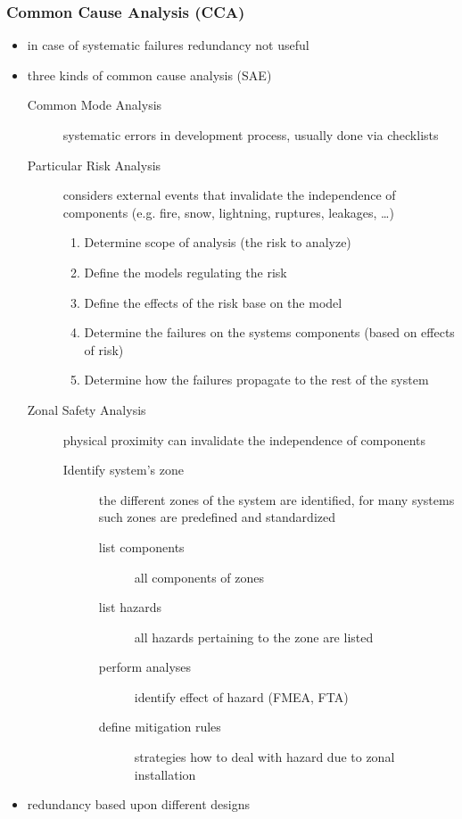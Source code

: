 \documentclass[a4paper, 10pt]{article}
\begin{document}
\subsubsection*{Common Cause Analysis (CCA)}
\begin{itemize}
    \item in case of systematic failures \follows redundancy not useful
    \item three kinds of common cause analysis (SAE)
    \begin{description}
        \item[Common Mode Analysis] systematic errors in development process, usually done via checklists
        \item[Particular Risk Analysis] considers external events that invalidate the independence of components (e.g. fire, snow, lightning, ruptures, leakages, \dots)
        \begin{enumerate}
            \item Determine scope of analysis (the risk to analyze)
            \item Define the models regulating the risk
            \item Define the effects of the risk base on the model
            \item Determine the failures on the systems components (based on effects of risk)
            \item Determine how the failures propagate to the rest of the system
        \end{enumerate}
        \item[Zonal Safety Analysis] physical proximity can invalidate the independence of components
        \begin{description}
            \item[Identify system's zone] the different zones of the system are identified, for many systems such zones are predefined and standardized
            \begin{description}
                \item[list components] all components of zones
                \item[list hazards] all hazards pertaining to the zone are listed
                \item[perform analyses] identify effect of hazard (FMEA, FTA)
                \item[define mitigation rules] strategies how to deal with hazard due to zonal installation
            \end{description}
        \end{description}
    \end{description}
    \item redundancy based upon different designs
\end{itemize}
\end{document}
